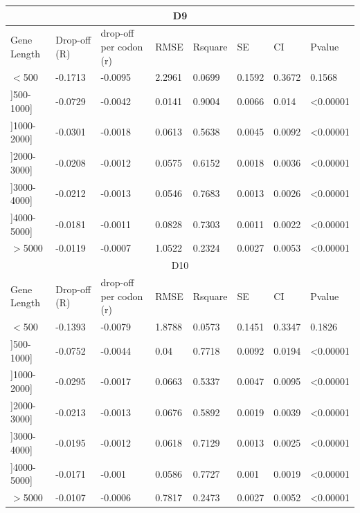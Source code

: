\documentclass[a4,center]{NAR} %
\begin{document}
\begin{table}[t]
{\begin{tabular} {|l|l|l|l|l|l|l|l|}
\hline
\multicolumn{8}{|c|}{D9} \\
\hline
Gene Length&Drop-off (R) & drop-off per codon (r)&RMSE& Rsquare &SE&CI &Pvalue\\
\hline
$<$500&-0.1713&-0.0095&2.2961&0.0699&0.1592&0.3672&0.1568   \\
\hline
]500-1000]&-0.0729&-0.0042&0.0141&0.9004&0.0066&0.014&\textless 0.00001    \\
\hline
]1000-2000]&-0.0301&-0.0018&0.0613&0.5638&0.0045&0.0092&\textless 0.00001    \\
\hline
]2000-3000]&-0.0208&-0.0012&0.0575&0.6152&0.0018&0.0036&\textless 0.00001   \\
\hline
]3000-4000]&-0.0212&-0.0013&0.0546&0.7683&0.0013&0.0026& \textless 0.00001  \\
\hline
]4000-5000]&-0.0181&-0.0011&0.0828&0.7303&0.0011&0.0022&\textless 0.00001 \\
\hline
$>$5000&-0.0119&-0.0007&1.0522&0.2324&0.0027&0.0053&\textless 0.00001   \\
\hline
\multicolumn{8}{|c|}{D10} \\
\hline
Gene Length&Drop-off (R) & drop-off per codon (r)&RMSE& Rsquare &SE&CI &Pvalue\\
\hline
$<$500&-0.1393&-0.0079&1.8788&0.0573&0.1451&0.3347&0.1826   \\
\hline
]500-1000]&-0.0752&-0.0044&0.04&0.7718&0.0092&0.0194&\textless 0.00001   \\
\hline
]1000-2000]&-0.0295&-0.0017&0.0663&0.5337&0.0047&0.0095&\textless 0.00001   \\
\hline
]2000-3000]&-0.0213&-0.0013&0.0676&0.5892&0.0019&0.0039& \textless 0.00001  \\
\hline
]3000-4000]&-0.0195&-0.0012&0.0618&0.7129&0.0013&0.0025&\textless 0.00001  \\
\hline
]4000-5000]&-0.0171&-0.001&0.0586&0.7727&0.001&0.0019&\textless 0.00001   \\
\hline
$>$5000&-0.0107&-0.0006&0.7817&0.2473&0.0027&0.0052&\textless 0.00001    \\
\hline
\end{tabular}%
}

\end{table}
\end{document}
